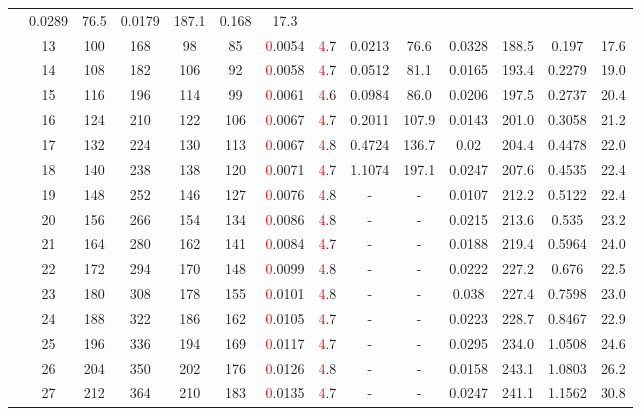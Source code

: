 \begin{table}[htb]
{\begin{tabular}{|c|c|c|c|c|c|c|c|c|c|c|c|c|c|}
 & 0.0289 & 76.5
 & 0.0179 & 187.1
 & 0.168 & 17.3
 \\
 & 
13 & 100 & 168 & 98 & 85
 & \textcolor{red}0.0054 & \textcolor{red}4.7
 & 0.0213 & 76.6
 & 0.0328 & 188.5
 & 0.197 & 17.6
 \\
 & 
14 & 108 & 182 & 106 & 92
 & \textcolor{red}0.0058 & \textcolor{red}4.7
 & 0.0512 & 81.1
 & 0.0165 & 193.4
 & 0.2279 & 19.0
 \\
 & 
15 & 116 & 196 & 114 & 99
 & \textcolor{red}0.0061 & \textcolor{red}4.6
 & 0.0984 & 86.0
 & 0.0206 & 197.5
 & 0.2737 & 20.4
 \\
 & 
16 & 124 & 210 & 122 & 106
 & \textcolor{red}0.0067 & \textcolor{red}4.7
 & 0.2011 & 107.9
 & 0.0143 & 201.0
 & 0.3058 & 21.2
 \\
 & 
17 & 132 & 224 & 130 & 113
 & \textcolor{red}0.0067 & \textcolor{red}4.8
 & 0.4724 & 136.7
 & 0.02 & 204.4
 & 0.4478 & 22.0
 \\
 & 
18 & 140 & 238 & 138 & 120
 & \textcolor{red}0.0071 & \textcolor{red}4.7
 & 1.1074 & 197.1
 & 0.0247 & 207.6
 & 0.4535 & 22.4
 \\
 & 
19 & 148 & 252 & 146 & 127
 & \textcolor{red}0.0076 & \textcolor{red}4.8
 & - & -
 & 0.0107 & 212.2
 & 0.5122 & 22.4
 \\
 & 
20 & 156 & 266 & 154 & 134
 & \textcolor{red}0.0086 & \textcolor{red}4.8
 & - & -
 & 0.0215 & 213.6
 & 0.535 & 23.2
 \\
 & 
21 & 164 & 280 & 162 & 141
 & \textcolor{red}0.0084 & \textcolor{red}4.7
 & - & -
 & 0.0188 & 219.4
 & 0.5964 & 24.0
 \\
 & 
22 & 172 & 294 & 170 & 148
 & \textcolor{red}0.0099 & \textcolor{red}4.8
 & - & -
 & 0.0222 & 227.2
 & 0.676 & 22.5
 \\
 & 
23 & 180 & 308 & 178 & 155
 & \textcolor{red}0.0101 & \textcolor{red}4.8
 & - & -
 & 0.038 & 227.4
 & 0.7598 & 23.0
 \\
 & 
24 & 188 & 322 & 186 & 162
 & \textcolor{red}0.0105 & \textcolor{red}4.7
 & - & -
 & 0.0223 & 228.7
 & 0.8467 & 22.9
 \\
 & 
25 & 196 & 336 & 194 & 169
 & \textcolor{red}0.0117 & \textcolor{red}4.7
 & - & -
 & 0.0295 & 234.0
 & 1.0508 & 24.6
 \\
 & 
26 & 204 & 350 & 202 & 176
 & \textcolor{red}0.0126 & \textcolor{red}4.8
 & - & -
 & 0.0158 & 243.1
 & 1.0803 & 26.2
 \\
 & 
27 & 212 & 364 & 210 & 183
 & \textcolor{red}0.0135 & \textcolor{red}4.7
 & - & -
 & 0.0247 & 241.1
 & 1.1562 & 30.8
 \\

\end{tabular}}
\end{table}
